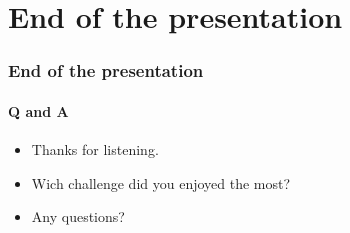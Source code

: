 \documentclass[]{beamer}
\begin{document}
%
%
\section*{End of the presentation}
\begin{frame}
    \frametitle{End of the presentation}
    \framesubtitle{Q and A}
    \begin{center}
        \begin{itemize}
            \item Thanks for listening.
            \item Wich challenge did you enjoyed the most?
            \item Any questions?
        \end{itemize}
    \end{center}
\end{frame}
\end{document}
